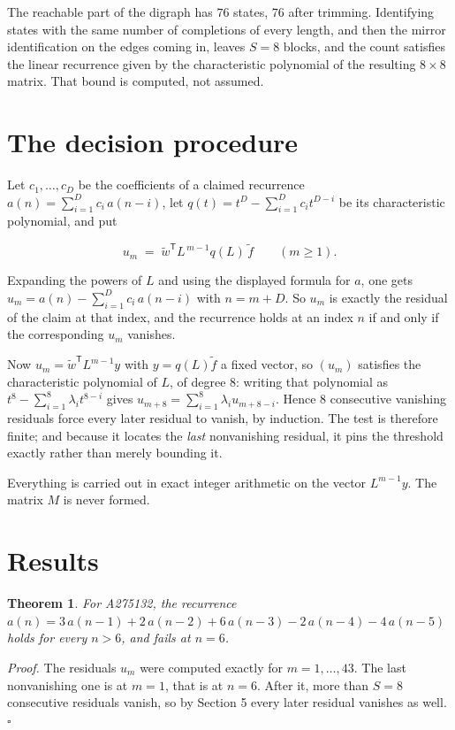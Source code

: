\documentclass[11pt]{article}
\newtheorem{theorem}{Theorem}
\theoremstyle{definition}
\begin{document}
The reachable part of the digraph has $76$ states, $76$ after trimming. Identifying states with the same number of completions of every length, and then the mirror identification on the edges coming in, leaves $S = 8$ blocks, and the count satisfies the linear recurrence given by the characteristic polynomial of the resulting $8\times8$ matrix. That bound is computed, not assumed.

\section{The decision procedure}

Let $c_1,\dots,c_D$ be the coefficients of a claimed recurrence $a(n) = \sum_{i=1}^{D} c_i\,a(n-i)$, let $q(t) = t^{D} - \sum_{i=1}^{D} c_i t^{D-i}$ be its characteristic polynomial, and put

\[u_m \;=\; \tilde w^{\mathsf T} L^{\,m-1} q(L)\,\tilde f \qquad (m \ge 1).\]

Expanding the powers of $L$ and using the displayed formula for $a$, one gets $u_m = a(n) - \sum_{i=1}^{D} c_i\,a(n-i)$ with $n = m + D$. So $u_m$ is exactly the residual of the claim at that index, and the recurrence holds at an index $n$ if and only if the corresponding $u_m$ vanishes.

Now $u_m = \tilde w^{\mathsf T} L^{m-1} y$ with $y = q(L)\tilde f$ a fixed vector, so $(u_m)$ satisfies the characteristic polynomial of $L$, of degree $8$: writing that polynomial as $t^{8} - \sum_{i=1}^{8} \lambda_i t^{8-i}$ gives $u_{m+8} = \sum_{i=1}^{8} \lambda_i u_{m+8-i}$. Hence $8$ consecutive vanishing residuals force every later residual to vanish, by induction. The test is therefore finite; and because it locates the {\itshape last} nonvanishing residual, it pins the threshold exactly rather than merely bounding it.

Everything is carried out in exact integer arithmetic on the vector $L^{m-1}y$. The matrix $M$ is never formed.

\section{Results}

\begin{theorem} For A275132, the recurrence $a(n) = 3\,a(n-1) + 2\,a(n-2) + 6\,a(n-3) - 2\,a(n-4) - 4\,a(n-5)$ holds for every $n > 6$, and fails at $n = 6$.\end{theorem}

{\itshape Proof.} The residuals $u_m$ were computed exactly for $m = 1,\dots,43$. The last nonvanishing one is at $m = 1$, that is at $n = 6$. After it, more than $S = 8$ consecutive residuals vanish, so by Section 5 every later residual vanishes as well. $\square$
\end{document}
